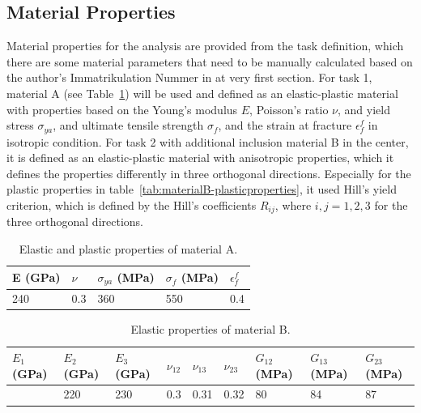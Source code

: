 \documentclass[12pt]{article}
\begin{document}
\subsection{Material Properties}
\hspace*{2em}Material properties for the analysis are provided from the task definition, which there are some
material parameters that need to be manually calculated based on the author's Immatrikulation Nummer in at very 
first section. 
For task 1, material A (see Table~\ref{tab:materialA-properties}) will be used and defined as an elastic-plastic material with properties based on the Young's modulus $E$, Poisson's ratio $\nu$, and yield stress $\sigma_{ya}$,
and ultimate tensile strength $\sigma_{f}$, and the strain at fracture $\epsilon_{f}^{f}$ in isotropic condition.   
For task 2 with additional inclusion material B in the center, it is defined as an elastic-plastic material with anisotropic properties, 
which it defines the properties differently in three orthogonal directions. Especially for the plastic properties in table~\ref{tab:materialB-plasticproperties},
it used Hill's yield criterion, which is defined by the Hill's coefficients $R_{ij}$, where $i,j = 1,2,3$ for the three orthogonal directions. 


\begin{table}[H]
    \centering
    \caption{Elastic and plastic properties of material A.}
    \label{tab:materialA-properties}
    \begin{tabular}{lllll}
        \toprule
        E (GPa) & $\nu$ & $\sigma_{ya}$ (MPa) & $\sigma_{f}$ (MPa) & $\epsilon_{f}^{f}$ \\
        \midrule
        240 & 0.3 & 360 & 550 & 0.4 \\
        \bottomrule
    \end{tabular}
\end{table}

\begin{table}[H]
    \centering
    \caption{Elastic properties of material B.}
    \label{tab:materialB-elasticproperties}
    \begin{tabular}{lllllllll}
        \toprule
            \centering $E_1$ (GPa) & $E_2$ (GPa) & $E_3$ (GPa) & $\nu_{12}$ & $\nu_{13}$ & $\nu_{23}$ & $G_{12}$ (MPa) & 
            $G_{13}$ (MPa) & $G_{23}$ (MPa) \\
            \midrule
            \centering 210 & 220 & 230 & 0.3 & 0.31 & 0.32 & 80 & 84 & 87 \\
            \bottomrule
    \end{tabular}
\end{table}
\end{document}
